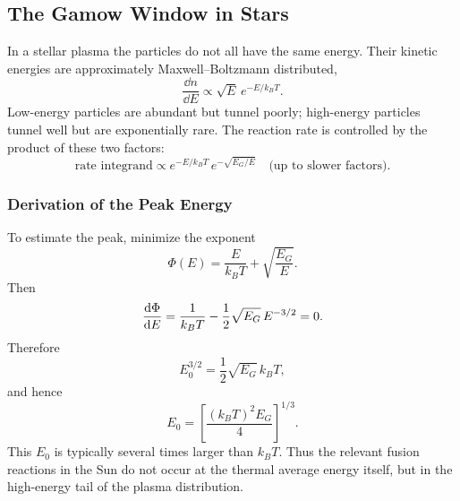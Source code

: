 \subsection{The Gamow Window in Stars}
\label{subsec:lec11:gamow_window}

In a stellar plasma the particles do not all have the same energy. Their kinetic
energies are approximately Maxwell--Boltzmann distributed,
\begin{equation}
  \frac{\dd n}{\dd E}\propto \sqrt{E}\,e^{-E/k_BT}.
\end{equation}
Low-energy particles are abundant but tunnel poorly; high-energy particles
tunnel well but are exponentially rare. The reaction rate is controlled by the
product of these two factors:
\begin{equation}
  \text{rate integrand}\propto e^{-E/k_BT}\,
  e^{-\sqrt{E_G/E}}
  \quad\text{(up to slower factors).}
  \label{eq:lec11:gamow_integrand}
\end{equation}


\subsubsection*{Derivation of the Peak Energy}
To estimate the peak, minimize the exponent
\begin{equation}
  \Phi(E)=\frac{E}{k_BT}+\sqrt{\frac{E_G}{E}}.
\end{equation}
Then
\begin{equation}
  \dv{\Phi}{E}
  =\frac{1}{k_BT}-\frac{1}{2}\sqrt{E_G}\,E^{-3/2}=0.
\end{equation}
Therefore
\begin{equation}
  E_0^{3/2}=\frac{1}{2}\sqrt{E_G}\,k_BT,
\end{equation}
and hence
\begin{equation}
  \boxed{E_0=\left[\frac{(k_BT)^2E_G}{4}\right]^{1/3}.}
  \label{eq:lec11:gamow_peak}
\end{equation}
This $E_0$ is typically several times larger than $k_BT$. Thus the relevant
fusion reactions in the Sun do not occur at the thermal average energy itself,
but in the high-energy tail of the plasma distribution.

